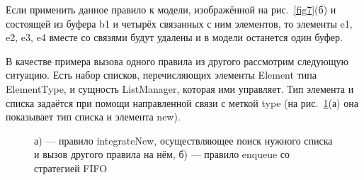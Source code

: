 \documentclass[a5paper]{article}
\begin{document}
Если применить данное правило к модели, изображённой на рис.~\ref{fig7}(б) и состоящей из буфера b1 и четырёх связанных с ним элементов, то элементы e1, e2, e3, e4 вместе со связями будут удалены и в модели останется один буфер.

В качестве примера вызова одного правила из другого рассмотрим следующую ситуацию. Есть набор списков, перечисляющих элементы Element типа ElementType, и сущность ListManager, которая ими управляет. Тип элемента и списка задаётся при помощи направленной связи с меткой type (на рис.~\ref{fig8}(а) она показывает тип списка и элемента new).

\begin{figure}[h]
\begin{center}
\begin{minipage}[h]{0.8\linewidth}
\end{minipage}
\begin{minipage}[h]{0.8\linewidth}
\end{minipage}
\end{center}
\caption{а) --- правило integrateNew, осуществляющее поиск нужного списка и вызов другого правила на нём, б) — правило enqueue со стратегией FIFO}
\label{fig8}
\end{figure}
\end{document}
